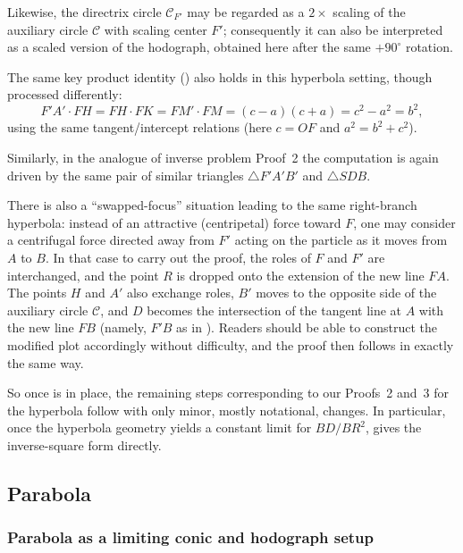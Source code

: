 Likewise, the directrix circle $\mathcal{C}_{F'}$ may be regarded as a $2\times$ scaling of the auxiliary circle $\mathcal C$ with scaling center $F'$; consequently it can also be interpreted as a scaled version of the hodograph, obtained here after the same \(+90^\circ\) rotation.

The same key product identity () also holds in this hyperbola setting, though processed differently:
\begin{equation}
  F'\!A'\cdot FH = FH\cdot FK = F\!M'\cdot FM = (c-a)(c+a)=c^2-a^2=b^2,
\end{equation}
using the same tangent/intercept relations (here $c=OF$ and $a^2=b^2+c^2$).

Similarly, in the analogue of inverse problem Proof~2 the computation is again driven by the same pair of similar triangles $\triangle F'\!A'B'$ and $\triangle SDB$.

There is also a ``swapped-focus'' situation leading to the same right-branch hyperbola: instead of an attractive (centripetal) force toward $F$, one may consider a centrifugal force directed away from $F'$ acting on the particle as it moves from $A$ to $B$.
In that case to carry out the proof, the roles of $F$ and $F'$ are interchanged, and the point $R$ is dropped onto the extension of the new line $FA$.
The points $H$ and $A'$ also exchange roles, $B'$ moves to the opposite side of the auxiliary circle $\mathcal C$, and $D$ becomes the intersection of the tangent line at $A$ with the new line $FB$ (namely, $F'B$ as in ). Readers should be able to construct the modified plot accordingly without difficulty, and the proof then follows in exactly the same way.

So once  is in place, the remaining steps corresponding to our Proofs~2 and~3 for the hyperbola follow with only minor, mostly notational, changes. In particular, once the hyperbola geometry yields a constant limit for $BD/BR^2$,  gives the inverse-square form directly.

\subsection{Parabola}
\label{subsec:parabola}

\subsubsection{Parabola as a limiting conic and hodograph setup}
\label{subsubsec:parabola-general}

